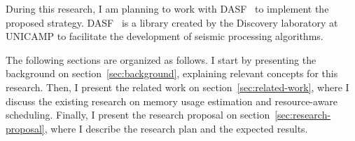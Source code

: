 During this research, I am planning to work with \ac{DASF}~\cite{dasf} to implement the proposed strategy.
\ac{DASF}~\cite{dasf} is a library created by the Discovery laboratory at \ac{UNICAMP} to facilitate the development of seismic processing algorithms.

The following sections are organized as follows.
I start by presenting the background on section~\ref{sec:background}, explaining relevant concepts for this research.
Then, I present the related work on section~\ref{sec:related-work}, where I discuss the existing research on memory usage estimation and resource-aware scheduling.
Finally, I present the research proposal on section~\ref{sec:research-proposal}, where I describe the research plan and the expected results.
